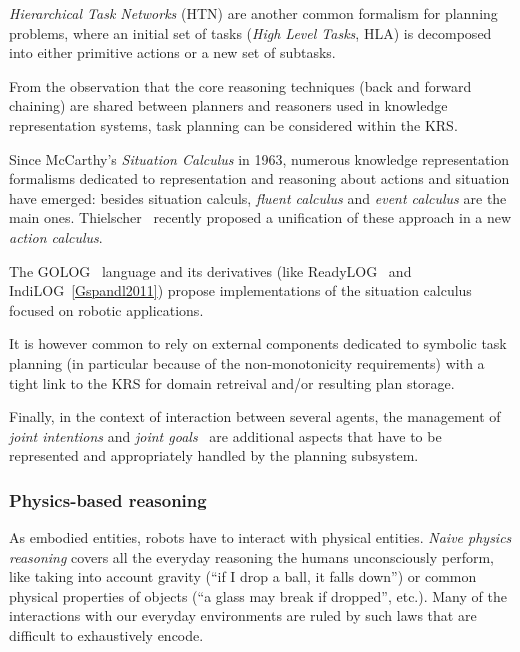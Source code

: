 \emph{Hierarchical Task Networks} (HTN) are another common formalism for
planning problems, where an initial set of tasks (\emph{High Level Tasks}, HLA)
is decomposed into either primitive actions or a new set of subtasks.

From the observation that the core reasoning techniques (back and forward
chaining) are shared between planners and reasoners used in knowledge
representation systems, task planning can be considered within the KRS.

Since McCarthy's \emph{Situation Calculus} in 1963, numerous knowledge
representation formalisms dedicated to representation and reasoning about
actions and situation have emerged: besides situation calculs, \emph{fluent
calculus} and \emph{event calculus} are the main ones.
Thielscher~\cite{Thielscher2011} recently proposed a unification of these
approach in a new \emph{action calculus}.

The GOLOG~\cite{Levesque1997} language and its derivatives (like {\sc
ReadyLOG}~\cite{Ferrein2008} and {\sc IndiLOG}~\ref{Gspandl2011}) propose
implementations of the situation calculus focused on robotic applications.


It is however common to rely on external components dedicated to symbolic task
planning (in particular because of the non-monotonicity requirements) with a
tight link to the KRS for domain retreival and/or resulting plan storage.

Finally, in the context of interaction between several agents, the management
of \emph{joint intentions} and \emph{joint goals}~\cite{Tomasello2005,
Bratman2009} are additional aspects that have to be represented and
appropriately handled by the planning subsystem.


\subsubsection{Physics-based reasoning}
\label{sect|physics}

As embodied entities, robots have to interact with physical entities.
\emph{Naive physics reasoning} covers all the everyday reasoning the humans
unconsciously perform, like taking into account gravity (``if I drop a ball, it
falls down'') or common physical properties of objects (``a glass may break if
dropped'', etc.). Many of the interactions with our everyday environments are
ruled by such laws that are difficult to exhaustively encode.

